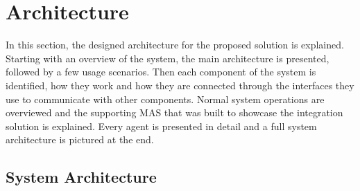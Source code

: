 











\glsresetall


\chapter{Architecture}
\label{cha:architecture}

In this section, the designed architecture for the proposed solution is explained. Starting with an overview of the system, the main architecture is presented, followed by a few usage scenarios. Then each component of the system is identified, how they work and how they are connected through the interfaces they use to communicate with other components. Normal system operations are overviewed and the supporting \acrlong{MAS} that was built to showcase the integration solution is explained. Every agent is presented in detail and a full system architecture is pictured at the end.

\section{System Architecture}
\label{sec:developed_architecture}

